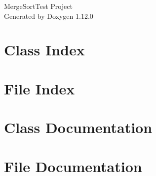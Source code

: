 \documentclass[twoside]{book}
\newcommand{\+}{\discretionary{\mbox{\scriptsize$\hookleftarrow$}}{}{}}
\newcommand{\clearemptydoublepage}{%
    \newpage{\pagestyle{empty}\cleardoublepage}%
  }
\begin{document}
  \raggedbottom
    \hypersetup{pageanchor=false,
                bookmarksnumbered=true,
                pdfencoding=unicode
               }
  \begin{titlepage}
  \vspace*{7cm}
  \begin{center}%
  {\Large Merge\+Sort\+Test Project}\\
  \vspace*{1cm}
  {\large Generated by Doxygen 1.12.0}\\
  \end{center}
  \end{titlepage}
  \clearemptydoublepage
  \tableofcontents
  \clearemptydoublepage
  \hypersetup{pageanchor=true}
\chapter{Class Index}

\chapter{File Index}

\chapter{Class Documentation}

\chapter{File Documentation}








  \backmatter
  \newpage
  \clearemptydoublepage
  \printindex
\end{document}
